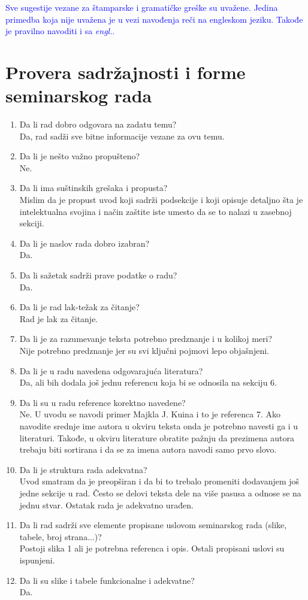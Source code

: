 \documentclass[a4paper]{report}
\newcommand{\odgovor}[1]{\textcolor{blue}{#1}}
\begin{document}
\odgovor{
	Sve sugestije vezane za štamparske i gramatičke greške su uvažene. 
	Jedina primedba koja nije uvažena je u vezi navođenja reči na engleskom jeziku. Takođe je pravilno
	navoditi i sa \emph{engl.}.
}

\section{Provera sadržajnosti i forme seminarskog rada}

\begin{enumerate}
\item Da li rad dobro odgovara na zadatu temu?\\ Da, rad sadži sve bitne informacije vezane za ovu temu.
\item Da li je nešto važno propušteno?\\ Ne.
\item Da li ima suštinskih grešaka i propusta?\\
 Mislim da je propust uvod koji sadrži podsekcije i koji opisuje detaljno šta je intelektualna svojina i način zaštite iste umesto da se to nalazi u zasebnoj sekciji. 
\item Da li je naslov rada dobro izabran?\\ Da.
\item Da li sažetak sadrži prave podatke o radu?\\ Da.
\item Da li je rad lak-težak za čitanje?\\ Rad je lak za čitanje. 
\item Da li je za razumevanje teksta potrebno predznanje i u kolikoj meri?\\ Nije potrebno predznanje jer su svi ključni pojmovi lepo objašnjeni.
\item Da li je u radu navedena odgovarajuća literatura?\\ Da, ali bih dodala još jednu referencu koja bi se odnosila na sekciju 6. 
\item Da li su u radu reference korektno navedene?\\ Ne.
U uvodu se navodi primer Majkla J. Kuina i to je referenca 7. Ako navodite srednje ime autora u okviru
teksta onda je potrebno navesti ga i u literaturi. Takođe, u okviru literature obratite pažnju da prezimena autora trebaju biti sortirana i da se za imena autora navodi samo prvo slovo.
\item Da li je struktura rada adekvatna?\\ Uvod smatram da je preopširan i da bi to trebalo promeniti dodavanjem još jedne sekcije u rad. Često se delovi teksta dele na više pasusa a odnose se na jednu stvar. Ostatak rada je adekvatno urađen.
\item Da li rad sadrži sve elemente propisane uslovom seminarskog rada (slike, tabele, broj strana...)?\\ Postoji slika 1 ali je potrebna referenca i opis. Ostali propisani uslovi su ispunjeni.
\item Da li su slike i tabele funkcionalne i adekvatne?\\ Da.
\end{enumerate}
\end{document}
